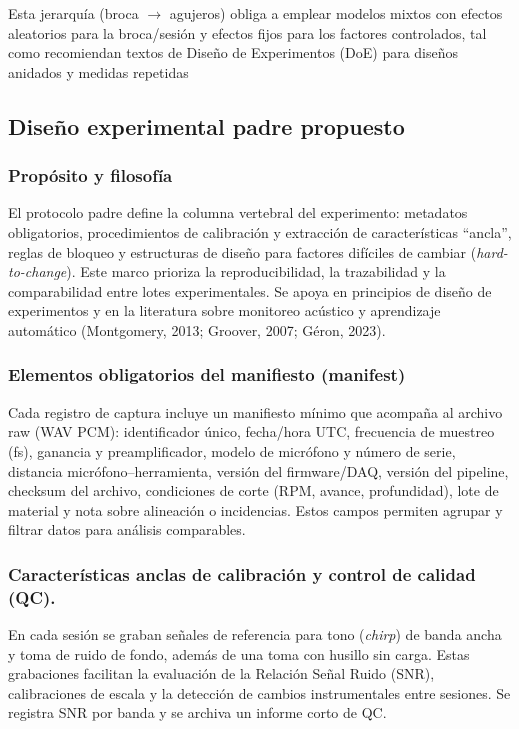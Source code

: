 \documentclass[12pt, letterpaper]{report}
\begin{document}
Esta jerarquía (broca $\rightarrow$ agujeros) obliga a emplear modelos mixtos con efectos aleatorios para la broca/sesión y efectos fijos para los factores controlados, tal como recomiendan textos de Diseño de Experimentos (DoE) para diseños anidados y medidas repetidas 

\subsection{Diseño experimental padre propuesto}

\subsubsection{Propósito y filosofía}

El protocolo padre define la columna vertebral del experimento: metadatos obligatorios, procedimientos de calibración y extracción de características “ancla”, reglas de bloqueo y estructuras de diseño para factores difíciles de cambiar (\textit{hard-to-change}). Este marco prioriza la reproducibilidad, la trazabilidad y la comparabilidad entre lotes experimentales. Se apoya en principios de diseño de experimentos y en la literatura sobre monitoreo acústico y aprendizaje automático (Montgomery, 2013; Groover, 2007; Géron, 2023).

\subsubsection{Elementos obligatorios del manifiesto (manifest)}

Cada registro de captura incluye un manifiesto mínimo que acompaña al archivo raw (WAV PCM): identificador único, fecha/hora UTC, frecuencia de muestreo (fs), ganancia y preamplificador, modelo de micrófono y número de serie, distancia micrófono--herramienta, versión del firmware/DAQ, versión del pipeline, checksum del archivo, condiciones de corte (RPM, avance, profundidad), lote de material y nota sobre alineación o incidencias. Estos campos permiten agrupar y filtrar datos para análisis comparables.

\subsubsection{Características anclas de calibración y control de calidad (QC).}

En cada sesión se graban señales de referencia para tono (\textit{chirp}) de banda ancha y toma de ruido de fondo, además de una toma con husillo sin carga. Estas grabaciones facilitan la evaluación de la Relación Señal Ruido (SNR), calibraciones de escala y la detección de cambios instrumentales entre sesiones. Se registra SNR por banda y se archiva un informe corto de QC.
\end{document}
